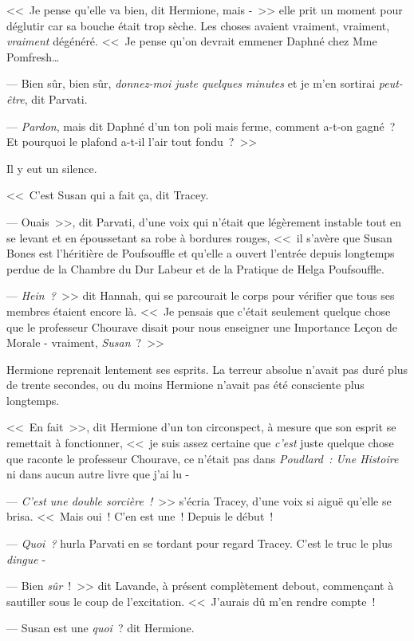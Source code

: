 <<~Je pense qu'elle va bien, dit Hermione, mais -~>> elle prit un moment pour déglutir car sa bouche était trop sèche. Les choses avaient vraiment, vraiment, \emph{vraiment} dégénéré. <<~Je pense qu'on devrait emmener Daphné chez Mme Pomfresh…

--- Bien sûr, bien sûr, \emph{donnez-moi juste quelques minutes} et je m'en sortirai \emph{peut-être}, dit Parvati.

--- \emph{Pardon}, mais dit Daphné d'un ton poli mais ferme, comment a-t-on gagné~? Et pourquoi le plafond a-t-il l'air tout fondu~?~>>

Il y eut un silence.

<<~C'est Susan qui a fait ça, dit Tracey.

--- Ouais~>>, dit Parvati, d'une voix qui n'était que légèrement instable tout en se levant et en époussetant sa robe à bordures rouges, <<~il s'avère que Susan Bones est l'héritière de Poufsouffle et qu'elle a ouvert l'entrée depuis longtemps perdue de la Chambre du Dur Labeur et de la Pratique de Helga Poufsouffle.

--- \emph{Hein~?}~>> dit Hannah, qui se parcourait le corps pour vérifier que tous ses membres étaient encore là. <<~Je pensais que c'était seulement quelque chose que le professeur Chourave disait pour nous enseigner une Importance Leçon de Morale - vraiment, \emph{Susan}~?~>>

Hermione reprenait lentement ses esprits. La terreur absolue n'avait pas duré plus de trente secondes, ou du moins Hermione n'avait pas été consciente plus longtemps.

<<~En fait~>>, dit Hermione d'un ton circonspect, à mesure que son esprit se remettait à fonctionner, <<~je suis assez certaine que \emph{c'est} juste quelque chose que raconte le professeur Chourave, ce n'était pas dans \emph{Poudlard~: Une Histoire} ni dans aucun autre livre que j'ai lu -

--- \emph{C'est une double sorcière~!}~>> s'écria Tracey, d'une voix si aiguë qu'elle se brisa. <<~Mais oui~! C'en est une~! Depuis le début~!

--- \emph{Quoi~?} hurla Parvati en se tordant pour regard Tracey. C'est le truc le plus \emph{dingue} -

--- Bien \emph{sûr}~!~>> dit Lavande, à présent complètement debout, commençant à sautiller sous le coup de l'excitation. <<~J'aurais dû m'en rendre compte~!

--- Susan est une \emph{quoi}~? dit Hermione.


